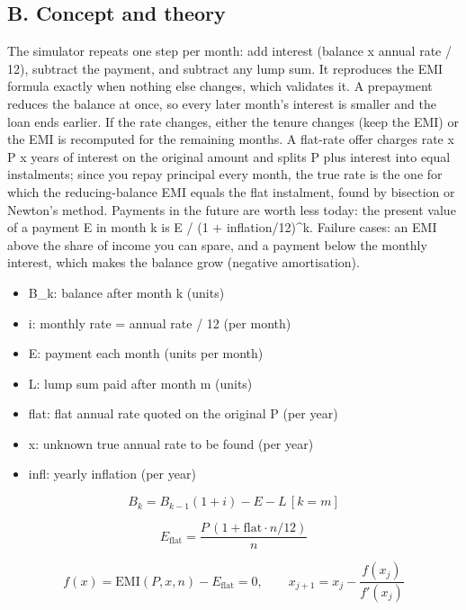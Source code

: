 \documentclass[11pt,a4paper]{article}
\begin{document}
\subsection*{B. Concept and theory}
The simulator repeats one step per month: add interest (balance x annual rate / 12), subtract the payment, and subtract any lump sum. It reproduces the EMI formula exactly when nothing else changes, which validates it. A prepayment reduces the balance at once, so every later month's interest is smaller and the loan ends earlier. If the rate changes, either the tenure changes (keep the EMI) or the EMI is recomputed for the remaining months. A flat-rate offer charges rate x P x years of interest on the original amount and splits P plus interest into equal instalments; since you repay principal every month, the true rate is the one for which the reducing-balance EMI equals the flat instalment, found by bisection or Newton's method. Payments in the future are worth less today: the present value of a payment E in month k is E / (1 + inflation/12)\textasciicircum{}k. Failure cases: an EMI above the share of income you can spare, and a payment below the monthly interest, which makes the balance grow (negative amortisation).

\begin{itemize}[nosep]
\item B\_k: balance after month k (units)
\item i: monthly rate = annual rate / 12 (per month)
\item E: payment each month (units per month)
\item L: lump sum paid after month m (units)
\item flat: flat annual rate quoted on the original P (per year)
\item x: unknown true annual rate to be found (per year)
\item infl: yearly inflation (per year)
\end{itemize}

\begin{equation*}
B_k=B_{k-1}(1+i)-E-L\,[k=m]
\end{equation*}

\begin{equation*}
E_{\text{flat}}=\frac{P\,(1+\text{flat}\cdot n/12)}{n}
\end{equation*}

\begin{equation*}
f(x)=\text{EMI}(P,x,n)-E_{\text{flat}}=0,\qquad x_{j+1}=x_j-\frac{f(x_j)}{f'(x_j)}
\end{equation*}
\end{document}
